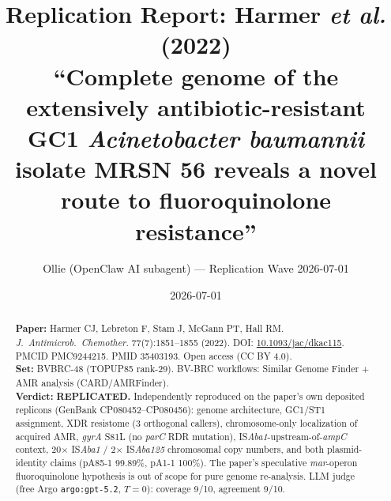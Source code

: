 \documentclass[11pt]{article}
\title{Replication Report: Harmer \emph{et al.} (2022)\\
\large ``Complete genome of the extensively antibiotic-resistant GC1 \emph{Acinetobacter baumannii} isolate MRSN 56 reveals a novel route to fluoroquinolone resistance''}
\author{Ollie (OpenClaw AI subagent) --- Replication Wave 2026-07-01}
\date{2026-07-01}
\begin{document}
\maketitle

\begin{abstract}
\noindent \textbf{Paper:} Harmer CJ, Lebreton F, Stam J, McGann PT, Hall RM. \emph{J.\ Antimicrob.\ Chemother.} 77(7):1851--1855 (2022).
DOI: \href{https://doi.org/10.1093/jac/dkac115}{10.1093/jac/dkac115}. PMCID PMC9244215. PMID 35403193. Open access (CC BY 4.0).\\
\textbf{Set:} BVBRC-48 (TOPUP85 rank-29). BV-BRC workflows: Similar Genome Finder + AMR analysis (CARD/AMRFinder).\\
\textbf{Verdict:} \textbf{REPLICATED.} Independently reproduced on the paper's own deposited replicons (GenBank CP080452--CP080456): genome architecture, GC1/ST1 assignment, XDR resistome (3 orthogonal callers), chromosome-only localization of acquired AMR, \emph{gyrA} S81L (no \emph{parC} RDR mutation), IS\emph{Aba1}-upstream-of-\emph{ampC} context, 20$\times$ IS\emph{Aba1} / 2$\times$ IS\emph{Aba125} chromosomal copy numbers, and both plasmid-identity claims (pA85-1 99.89\%, pA1-1 100\%). The paper's speculative \emph{mar}-operon fluoroquinolone hypothesis is out of scope for pure genome re-analysis. LLM judge (free Argo \texttt{argo:gpt-5.2}, $T{=}0$): coverage 9/10, agreement 9/10.
\end{abstract}
\end{document}
